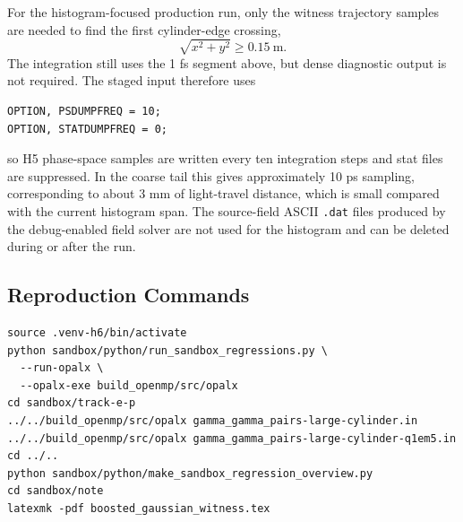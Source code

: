\documentclass[11pt]{article}
\numberwithin{equation}{section}
\begin{document}
For the histogram-focused production run, only the witness trajectory samples
are needed to find the first cylinder-edge crossing,
\begin{equation}
  \sqrt{x^2+y^2}\geq 0.15~\mathrm{m}.
\end{equation}
The integration still uses the 1 fs segment above, but dense diagnostic output
is not required.  The staged input therefore uses
\begin{verbatim}
OPTION, PSDUMPFREQ = 10;
OPTION, STATDUMPFREQ = 0;
\end{verbatim}
so H5 phase-space samples are written every ten integration steps and stat
files are suppressed.  In the coarse tail this gives approximately 10 ps
sampling, corresponding to about 3 mm of light-travel distance, which is small
compared with the current histogram span.  The source-field ASCII
\texttt{.dat} files produced by the debug-enabled field solver are not used for
the histogram and can be deleted during or after the run.

\subsection{Reproduction Commands}

\begin{verbatim}
source .venv-h6/bin/activate
python sandbox/python/run_sandbox_regressions.py \
  --run-opalx \
  --opalx-exe build_openmp/src/opalx
cd sandbox/track-e-p
../../build_openmp/src/opalx gamma_gamma_pairs-large-cylinder.in
../../build_openmp/src/opalx gamma_gamma_pairs-large-cylinder-q1em5.in
cd ../..
python sandbox/python/make_sandbox_regression_overview.py
cd sandbox/note
latexmk -pdf boosted_gaussian_witness.tex
\end{verbatim}
\end{document}
